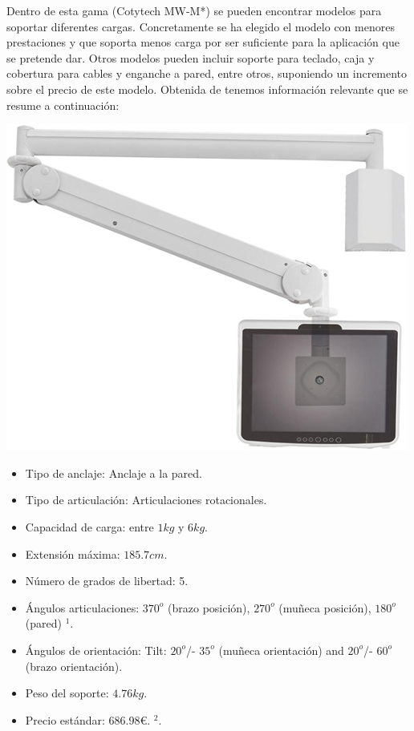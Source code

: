 Dentro de esta gama (Cotytech MW-M*) se pueden encontrar modelos para soportar diferentes cargas. Concretamente se ha elegido el modelo con menores prestaciones y que soporta menos carga por ser suficiente para la aplicación que se pretende dar. Otros modelos pueden incluir soporte para teclado, caja y cobertura para cables y enganche a pared, entre otros, suponiendo un incremento sobre el precio de este modelo. Obtenida de \cite{CotytechMWM13P:2018} tenemos información relevante que se resume a continuación:

\begin{minipage}{0.35\textwidth}
	\includegraphics[width=\linewidth]{figuras/Imagenes_EstadoArte/Cotytech_MW-M13P.jpg}
\end{minipage}
\begin{minipage}{0.65\textwidth}\raggedright
	\hspace{1cm}
	\begin{itemize}
		\item Tipo de anclaje: Anclaje a la pared.
		\item Tipo de articulación: Articulaciones rotacionales.
		\item Capacidad de carga: entre $1kg$ y $6kg$.
		\item Extensión máxima: $185.7cm$.
		\item Número de grados de libertad: 5.
		\item Ángulos articulaciones: $370^o$ (brazo posición), $270^o$ (muñeca posición), $180^o$ (pared) $^1$. %
		\item Ángulos de orientación: Tilt: $20^o$/- $35^o$ (muñeca orientación) and $20^o$/- $60^o$ (brazo orientación).
		\item Peso del soporte: $4.76 kg$.
		\item Precio estándar: 686.98\euro. $^2$. %
	\end{itemize}
\end{minipage}

